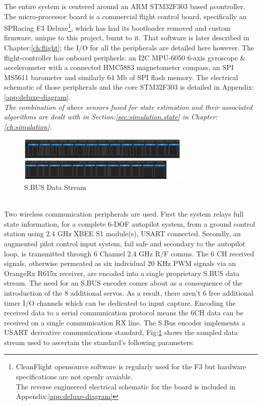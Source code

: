The entire system is centered around an ARM STM32F303\cite{stm32f303} based $\mu$controller. The micro-processor board is a commercial flight control board, specifically an SPRacing F3 Deluxe\cite{spracing}\footnote{CleanFlight opensource software is regularly used for the F3 but hardware specifications are not openly avaiable.\\The reverse engineered electrical schematic for the board is included in Appendix:\ref{app:deluxe-diagram}}, which has had its bootloader removed and custom firmware, unique to this project, burnt to it. That software is later described in Chapter:\ref{ch:flight}; the I/O for all the peripherals are detailed here however. The flight-controller has onboard peripherls: an I2C MPU-6050\cite{mpu6050} 6-axis gyroscope \& accelerometer with a connected HMC5883\cite{hmc5883} magnetometer compass, an SPI MS5611\cite{ms5611} barometer and similarly 64 Mb of SPI flash memory. The electrical schematic of those peripherals and the core STM32F303 is detailed in Appendix:\ref{app:deluxe-diagram}. 
\\
\emph{\color{Gray} The combination of above sensors fused for state estimation and their associated algorithms are dealt with in Section:\ref{sec:simulation.state} in Chapter:\ref{ch:simulation}.}
\begin{figure}[hbtp]
\centering
\includegraphics[width=\textwidth]{figs/sbus}
\caption{S.BUS Data Stream}
\label{fig:sbus}
\end{figure}
\\
Two wireless communication peripherals are used. First the system relays full state information, for a complete 6-DOF autopilot system, from a ground control station using 2.4 GHz XBEE S1 module(s)\cite{xbees1}, USART connected. Secondly, an augmented pilot control input system, fail safe and secondary to the autopilot loop, is transmitted through 6 Channel 2.4 GHz R/F comms. The 6 CH received signals, otherwise permeated as six individual 20 KHz PWM signals via an OrangeRx R615x\cite{r615x} receiver, are encoded into a single proprietary S.BUS data stream. 
\newpage
The need for an S.BUS encoder \cite{sbusencoder} comes about as a consequence of the introduction of the 8 additional servos. As a result, there aren't 6 free additional timer I/O channels which can be dedicated to input capture. Encoding the received data to a serial communication protocol means the 6CH data can be received on a single communication RX line. The S.Bus encoder implements a USART derivative communications standard, Fig:\ref{fig:sbus} shows the sampled data stream used to ascertain the standard's following parameters:

